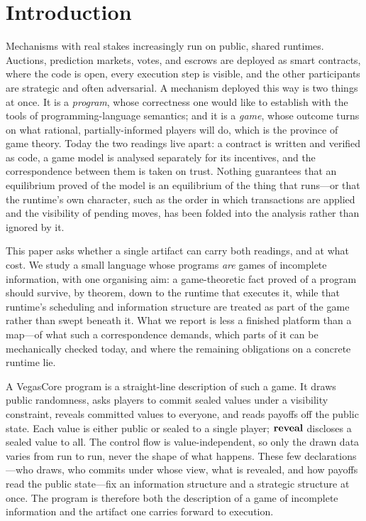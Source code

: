 \section{Introduction}
\label{sec:intro}

Mechanisms with real stakes increasingly run on public, shared runtimes.
Auctions, prediction markets, votes, and escrows are deployed as smart
contracts, where the code is open, every execution step is visible, and the
other participants are strategic and often adversarial.  A mechanism deployed
this way is two things at once.  It is a \emph{program}, whose correctness one
would like to establish with the tools of programming-language semantics; and
it is a \emph{game}, whose outcome turns on what rational, partially-informed
players will do, which is the province of game theory.  Today the two readings
live apart: a contract is written and verified as code, a game model is
analysed separately for its incentives, and the correspondence between them is
taken on trust.  Nothing guarantees that an equilibrium proved of the model is
an equilibrium of the thing that runs---or that the runtime's own character,
such as the order in which transactions are applied and the visibility of
pending moves, has been folded into the analysis rather than ignored by it.

This paper asks whether a single artifact can carry both readings, and at what
cost.  We study a small language whose programs \emph{are} games of incomplete
information, with one organising aim: a game-theoretic fact proved of a program
should survive, by theorem, down to the runtime that executes it, while that
runtime's scheduling and information structure are treated as part of the game
rather than swept beneath it.  What we report is less a finished platform than
a map---of what such a correspondence demands, which parts of it can be
mechanically checked today, and where the remaining obligations on a concrete
runtime lie.

A VegasCore program is a straight-line description of such a game.  It draws
public randomness, asks players to commit sealed values under a visibility
constraint, reveals committed values to everyone, and reads payoffs off the
public state.  Each value is either public or sealed to a single player;
\(\mathbf{reveal}\) discloses a sealed value to all.  The control flow is
value-independent, so only the drawn data varies from run to run, never the
shape of what happens.  These few declarations---who draws, who commits under
whose view, what is revealed, and how payoffs read the public state---fix an
information structure and a strategic structure at once.  The program is
therefore both the description of a game of incomplete information and the
artifact one carries forward to execution.


